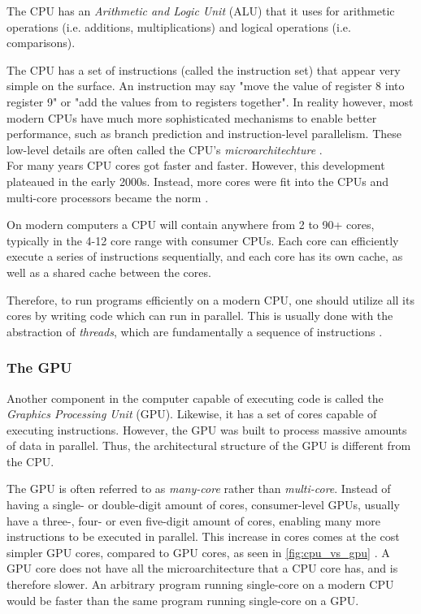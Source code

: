 The CPU has an \textit{Arithmetic and Logic Unit} (ALU) that it uses for arithmetic operations (i.e. additions, multiplications) and logical operations (i.e. comparisons).

The CPU has a set of instructions (called the instruction set) that appear very simple on the surface. An instruction may say "move the value of register 8 into register 9" or "add the values from to registers together". In reality however, most modern CPUs have much more sophisticated mechanisms to enable better performance, such as branch prediction and instruction-level parallelism. These low-level details are often called the CPU's \textit{microarchitechture} \cite[p. 10]{computersystems}.\\

\noindent For many years CPU cores got faster and faster. However, this development plateaued in the early 2000s. Instead, more cores were fit into the CPUs and multi-core processors became the norm \cite{karlrupp:processor_trend_data}.

On modern computers a CPU will contain anywhere from 2 to 90+ cores, typically in the 4-12 core range with consumer CPUs. Each core can efficiently execute a series of instructions sequentially, and each core has its own cache, as well as a shared cache between the cores.

Therefore, to run programs efficiently on a modern CPU, one should utilize all its cores by writing code which can run in parallel. This is usually done with the abstraction of \textit{threads}, which are fundamentally a sequence of instructions \cite[p. 1022]{computersystems}.

\subsubsection{The GPU} \label{sect:background_gpu}

\noindent Another component in the computer capable of executing code is called the \textit{Graphics Processing Unit} (GPU). Likewise, it has a set of cores capable of executing instructions. However, the GPU was built to process massive amounts of data in parallel. Thus, the architectural structure of the GPU is different from the CPU.

The GPU is often referred to as \textit{many-core} rather than \textit{multi-core}. Instead of having a single- or double-digit amount of cores, consumer-level GPUs, usually have a three-, four- or even five-digit amount of cores, enabling many more instructions to be executed in parallel. This increase in cores comes at the cost simpler GPU cores, compared to GPU cores, as seen in \ref{fig:cpu_vs_gpu} \cite[Sect. 1.1]{nvidia:cudadoc}. A GPU core does not have all the microarchitecture that a CPU core has, and is therefore slower. An arbitrary program running single-core on a modern CPU would be faster than the same program running single-core on a GPU.

